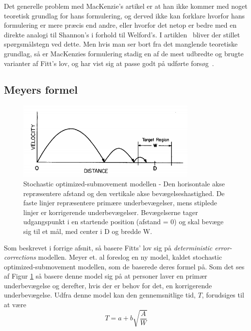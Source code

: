 Det generelle problem med MacKenzie's artikel er at han ikke kommer med noget teoretisk grundlag for hans formulering, og derved ikke kan forklare hvorfor hans formulering er mere præcis end andre, eller hvorfor det netop er bedre med en direkte analogi til Shannon's i forhold til Welford's. I artiklen~\cite{drewes2010} bliver der stillet spørgsmålstegn ved dette. Men hvis man ser bort fra det manglende teoretiske grundlag, så er MacKenzies formulering stadig en af de mest udbredte og brugte varianter af Fitt's lov, og har vist sig at passe godt på udførte forsøg~\cite{goldberg2015}.

\subsection*{Meyers formel}
\begin{figure}[h]
\centering
\includegraphics[scale=1.0]{images/illustrations/meyer_plot_theory}
\caption{Stochastic optimized-submovement modellen - Den horisontale akse repræsentere afstand og den vertikale akse bevægelseshastighed. De faste linjer repræsentere primære underbevægelser, mens stiplede linjer er korrigerende underbevægelser. Bevægelserne tager udgangspunkt i en startende position (afstand = 0) og skal bevæge sig til et mål, med center i D og bredde W.}
\label{fig:MeyerTheory}
\end{figure}
Som beskrevet i forrige afsnit, så basere Fitts' lov sig på \emph{deterministic error-corrections} modellen. Meyer et. al foreslog en ny model, kaldet stochastic optimized-submovement modellen, som de baserede deres formel på\cite{meyer1988}. Som det ses af Figur \ref{fig:MeyerTheory} så basere denne model sig på at personer laver en primær underbevægelse og derefter, hvis der er behov for det, en korrigerende underbevægelse. Udfra denne model kan den gennemsnitlige tid, $T$, forudsiges til at være
\begin{equation}
\label{eq:meyer}
T = a + b \sqrt{\frac{A}{W}}
\end{equation}

